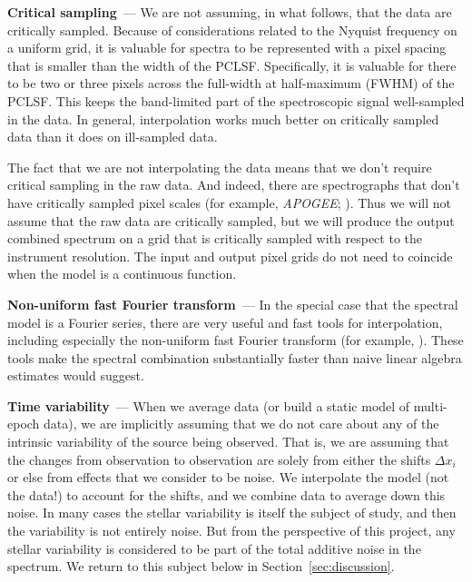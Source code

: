 \documentclass[modern, linenumbers]{aastex631}
\renewcommand{\paragraph}[1]{\medskip\par\noindent\textbf{#1}~---}
\newcommand{\sectionname}{Section}
\newcommand{\secref}[1]{\sectionname~\ref{#1}}
\begin{document}
\paragraph{Critical sampling}
We are not assuming, in what follows, that the data are critically sampled.
Because of considerations related to the Nyquist frequency on a uniform grid, it is valuable for spectra to be represented with a pixel spacing that is smaller than the width of the PCLSF.
Specifically, it is valuable for there to be two or three pixels across the full-width at half-maximum (FWHM) of the PCLSF.
This keeps the band-limited part of the spectroscopic signal well-sampled in the data.
In general, interpolation works much better on critically sampled data than it does on ill-sampled data.

The fact that we are not interpolating the data means that we don't require critical sampling in the raw data.
And indeed, there are spectrographs that don't have critically sampled pixel scales (for example, \textsl{APOGEE}; \citealt{apogee}).
Thus we will not assume that the raw data are critically sampled, but we will produce the output combined spectrum on a grid that is critically sampled with respect to the instrument resolution.
The input and output pixel grids do not need to coincide when the model is a continuous function.

\paragraph{Non-uniform fast Fourier transform}
In the special case that the spectral model is a Fourier series, there are very useful and fast tools for interpolation, including especially the non-uniform fast Fourier transform (for example, \citealt{finufft}).
These tools make the spectral combination substantially faster than naive linear algebra estimates would suggest.

\paragraph{Time variability}
When we average data (or build a static model of multi-epoch data), we are implicitly assuming that we do not care about any of the intrinsic variability of the source being observed.
That is, we are assuming that the changes from observation to observation are solely from either the shifts $\Delta x_i$ or else from effects that we consider to be noise.
We interpolate the model (not the data!) to account for the shifts, and we combine data to average down this noise.
In many cases the stellar variability is itself the subject of study, and then the variability is not entirely noise.
But from the perspective of this project, any stellar variability is considered to be part of the total additive noise in the spectrum.
We return to this subject below in \secref{sec:discussion}.
\end{document}

